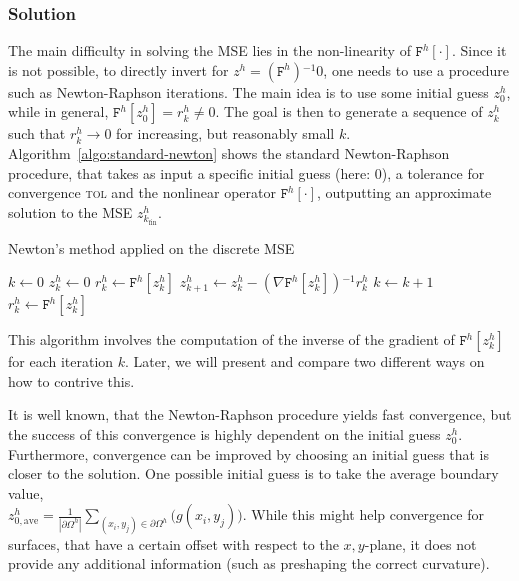 \documentclass[11pt]{scrartcl}
\newcommand{\mSurfDisc}[1]{\ensuremath{\mathtt{F}^h\left[#1\right]}}
\newcommand{\inv}{\ensuremath{^{-1}}}
\begin{document}
\subsubsection{Solution}
The main difficulty in solving the MSE lies in the non-linearity of $\mSurfDisc{\cdot}$. Since it is not possible, to directly invert for $z^h = \left(\mathtt{F}^h\right)\inv 0$, one needs to use a procedure such as Newton-Raphson iterations. The main idea is to use some initial guess $z^h_0$, while in general, $\mSurfDisc{z^h_0}=r^h_k\neq0$. The goal is then to generate a sequence of $z^h_k$ such that $r^h_k\to 0$ for increasing, but reasonably small $k$. Algorithm~\ref{algo:standard-newton} shows the standard Newton-Raphson procedure, that takes as input a specific initial guess (here: 0), a tolerance for convergence \textsc{tol} and the nonlinear operator $\mSurfDisc{\cdot}$, outputting an approximate solution to the MSE $z^h_{k_\text{fin}}$.
\begin{algorithm}
	\caption{Newton's method applied on the discrete MSE}\label{algo:standard-newton}
	\begin{algorithmic}
		\State $k \gets 0$ 
		\State $z^h_k \gets 0 $ 
		\State $r^h_k \gets \mSurfDisc{z^h_k}$
		 
			\State $z^h_{k+1} \gets z^h_{k} - \left(\nabla\mSurfDisc{z^h_k}\right)\inv r^h_k $
			\State $k \gets k+1$ 
			\State $r^h_k \gets \mSurfDisc{z^h_k}$
		\EndWhile
	\end{algorithmic}
\end{algorithm}

This algorithm involves the computation of the inverse of the gradient of $\mSurfDisc{z^h_k}$ for each iteration $k$. Later, we will present and compare two different ways on how to contrive this.

It is well known, that the Newton-Raphson procedure yields fast convergence, but the success of this convergence is highly dependent on the initial guess $z^h_0$. Furthermore, convergence can be improved by choosing an initial guess that is closer to the solution. 
One possible initial guess is to take the average boundary value, \\$z^h_{0,\text{ave}}=\frac{1}{|\partial\Omega^h|} \sum_{(x_i,y_j)\in \partial\Omega^h} \big(g(x_i,y_j)\big)$. While this might help convergence for surfaces, that have a certain offset with respect to the $x,y$-plane, it does not provide any additional information (such as preshaping the correct curvature).
\end{document}

